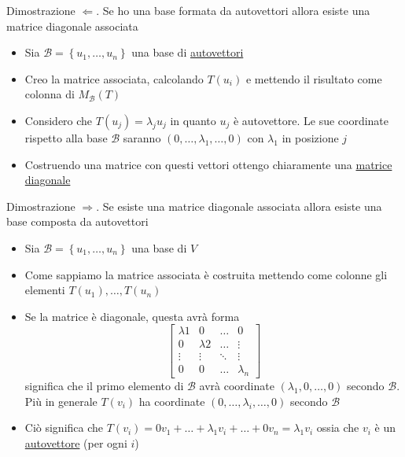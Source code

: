 \documentclass[12pt,a4paper,oneside]{article}
\begin{document}
\label{teo:diagonalizzabilità}
Dimostrazione $ \Leftarrow $. Se ho una base formata da autovettori allora esiste una matrice diagonale associata
\begin{itemize}
	\item Sia $ \mathcal{B}= \left\{ u_1,\ldots,u_n \right\}  $ una base di \underline{autovettori}
	\item Creo la matrice associata, calcolando $ T\left( u_i \right)  $ e mettendo il risultato come colonna di $ M_{ \mathcal{B}} \left( T \right)  $
	\item Considero che $ T\left( u_j \right) = \lambda_j u_j $ in quanto $ u_j $ è autovettore. Le sue coordinate rispetto alla base $ \mathcal{B} $ saranno $ \left( 0,\ldots, \lambda_1, \ldots, 0 \right)  $ con $ \lambda_1 $ in posizione $ j $
	\item Costruendo una matrice con questi vettori ottengo chiaramente una \underline{matrice diagonale}
\end{itemize}
Dimostrazione $ \Rightarrow $. Se esiste una matrice diagonale associata allora esiste una base composta da autovettori
\begin{itemize}
	\item Sia $ \mathcal{B} = \left\{ u_1,\ldots,u_n \right\}  $ una base di $ V $
	\item Come sappiamo la matrice associata è costruita mettendo come colonne gli elementi $ T\left( u_1 \right) ,\ldots, T\left( u_n \right)  $
	\item Se la matrice è diagonale, questa avrà forma
	      \[
		      \begin{bmatrix}
			      \lambda 1 & 0          & \ldots & 0          \\
			      0         & \lambda  2 & \ldots & \vdots     \\
			      \vdots    & \vdots     & \ddots & \vdots     \\
			      0         & 0          & \ldots & \lambda _n
		      \end{bmatrix}
	      \]
	      significa che il primo elemento di $ \mathcal{B} $ avrà coordinate $ \left( \lambda _1,0,\ldots,0 \right)  $ secondo $ \mathcal{B} $. Più in generale $ T\left( v_i \right)  $ ha coordinate $ \left( 0,\ldots, \lambda _i, \ldots,0 \right)  $ secondo $ \mathcal{B} $
	\item Ciò significa che $ T\left( v_i \right) = 0 v_1 + \ldots + \lambda_1 v_i + \ldots+ 0 v_n =\lambda _1 v_i$ ossia che $ v_i $ è un \underline{autovettore} (per ogni $ i $)
\end{itemize}
\end{document}
